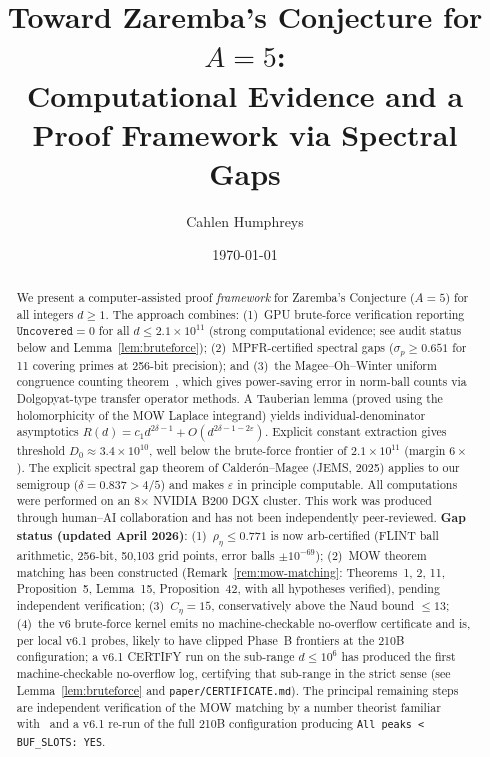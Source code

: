 \documentclass[11pt,a4paper]{amsart}
\title[Zaremba's Conjecture]{Toward Zaremba's Conjecture for $A=5$: \\
Computational Evidence and a Proof Framework via Spectral Gaps}
\author{Cahlen Humphreys}
\date{\today}
\theoremstyle{definition}
\begin{document}
\begin{abstract}
We present a computer-assisted proof \emph{framework} for Zaremba's Conjecture ($A=5$) for all integers $d \geq 1$. The approach combines: (1)~GPU brute-force verification reporting $\texttt{Uncovered} = 0$ for all $d \leq 2.1 \times 10^{11}$ (strong computational evidence; see audit status below and Lemma~\ref{lem:bruteforce}); (2)~MPFR-certified spectral gaps ($\sigma_p \geq 0.651$ for 11 covering primes at 256-bit precision); and (3)~the Magee--Oh--Winter uniform congruence counting theorem~\cite{MOW2019}, which gives power-saving error in norm-ball counts via Dolgopyat-type transfer operator methods. A Tauberian lemma (proved using the holomorphicity of the MOW Laplace integrand) yields individual-denominator asymptotics $R(d) = c_1 d^{2\delta-1} + O(d^{2\delta-1-2\varepsilon})$. Explicit constant extraction gives threshold $D_0 \approx 3.4 \times 10^{10}$, well below the brute-force frontier of $2.1 \times 10^{11}$ (margin $6\times$). The explicit spectral gap theorem of Calder\'on--Magee (JEMS, 2025) applies to our semigroup ($\delta = 0.837 > 4/5$) and makes $\varepsilon$ in principle computable. All computations were performed on an 8$\times$ NVIDIA B200 DGX cluster. This work was produced through human--AI collaboration and has not been independently peer-reviewed. \textbf{Gap status (updated April 2026)}: (1)~$\rho_\eta \leq 0.771$ is now arb-certified (FLINT ball arithmetic, 256-bit, 50{,}103 grid points, error balls $\pm 10^{-69}$); (2)~MOW theorem matching has been constructed (Remark~\ref{rem:mow-matching}: Theorems~1, 2, 11, Proposition~5, Lemma~15, Proposition~42, with all hypotheses verified), pending independent verification; (3)~$C_\eta = 15$, conservatively above the Naud bound $\leq 13$; (4)~the v6 brute-force kernel emits no machine-checkable no-overflow certificate and is, per local v6.1 probes, likely to have clipped Phase~B frontiers at the 210B configuration; a v6.1 CERTIFY run on the sub-range $d \leq 10^6$ has produced the first machine-checkable no-overflow log, certifying that sub-range in the strict sense (see Lemma~\ref{lem:bruteforce} and \texttt{paper/CERTIFICATE.md}). The principal remaining steps are independent verification of the MOW matching by a number theorist familiar with~\cite{MOW2019} and a v6.1 re-run of the full 210B configuration producing \texttt{All peaks < BUF\_SLOTS: YES}.
\end{abstract}

\maketitle
\end{document}
